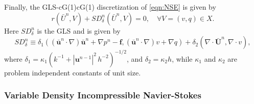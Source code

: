 Finally, the GLS-cG(1)cG(1) discretization of \eqref{eqn:NSE} is given by
\begin{equation}
  r(\bar{U}^n,V) + SD_{\delta}^n(\bar{U}^n,V) = 0, \quad \forall V=(v,q) \in X.
  \label{eqn:G2}
\end{equation}
Here $SD_{\delta}^n$ is the GLS and is given by
\begin{equation}
  SD_{\delta}^n \equiv
    \delta_1 (\left(\bar{\mathbf{u}}^n \cdot \nabla \right) \bar{\mathbf{u}}^n
        + \nabla p^n - \mathbf{f},
      \left(\bar{\mathbf{u}}^n \cdot \nabla \right) v + \nabla q)
      + \delta_2 (\nabla \cdot \bar{\mathbf{U}}^n, \nabla \cdot v),
  \label{eqn:NSEStabilization}
\end{equation}
where $\delta_1 = \kappa_1 (k^{-1} + |\mathbf{u}^{n-1}|^2\, h^{-2})^{-1/2}$, and
$\delta_2 = \kappa_2 h$, while $\kappa_1$ and $\kappa_2$ are problem independent
constants of unit size.


\begin{test} \label{tst:Cylinder2D}
\end{test}

\begin{test} \label{tst:Rectangle2D}
\end{test}

\begin{test} \label{tst:Rectangle3D}
\end{test}

\subsubsection{Variable Density Incompressible Navier-Stokes}
\begin{test} \label{tst:rhoNSE}
\end{test}
